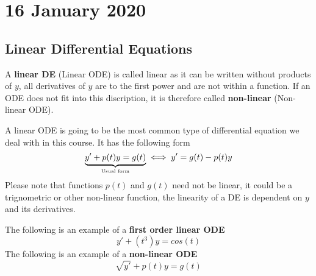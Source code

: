 \documentclass[diffeq.tex]{subfiles}
\begin{document}
\chapter{16 January 2020}
    \section{Linear Differential Equations}
    \begin{definition}
        A \textbf{linear DE} (Linear ODE) is called linear as it can be written without products of $y$, all derivatives of $y$ are to the first power and are not within a function. If an ODE does not fit into this discription, it is therefore called \textbf{non-linear} (Non-linear ODE).
    \end{definition}
    A linear ODE is going to be the most common type of differential equation we deal with in this course. It has the following form
    \begin{equation}
        \underbrace{y' + p(t)y = g(t)}_\text{\tiny Usual form}\iff y' = g(t) - p(t)y
    \end{equation}
    Please note that functions $p(t)$ and $g(t)$ need not be linear, it could be a trignometric or other non-linear function, the linearity of a DE is dependent on $y$ and its derivatives.
    \begin{example}
        The following is an example of a \textbf{first order linear ODE}
        \begin{equation}
            y' + \left(t^{3}\right)y = cos(t)
        \end{equation}
        The following is an example of a \textbf{non-linear ODE}
        \begin{equation}
            \sqrt{y'} + p(t)y = g(t)
        \end{equation}
    \end{example}
    \np
\end{document}
